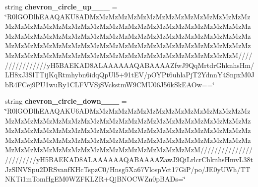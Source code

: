 \begin{DoxyCompactItemize}
\item 
\mbox{\label{class_c_utils_1_1_utils_1_1_resources_1_1_icons_af47ddce59f48636391343fb129f34833}} 
string {\bfseries chevron\+\_\+circle\+\_\+up\+\_\+\_\+\_} = \char`\"{}R0l\+G\+O\+Dlh\+E\+A\+A\+Q\+A\+K\+U8\+A\+D\+Mz\+Mz\+Mz\+Mz\+Mz\+Mz\+Mz\+Mz\+Mz\+Mz\+Mz\+Mz\+Mz\+Mz\+Mz\+Mz\+Mz\+Mz\+Mz\+Mz\+Mz\+Mz\+Mz\+Mz\+Mz\+Mz\+Mz\+Mz\+Mz\+Mz\+Mz\+Mz\+Mz\+Mz\+Mz\+Mz\+Mz\+Mz\+Mz\+Mz\+Mz\+Mz\+Mz\+Mz\+Mz\+Mz\+Mz\+Mz\+Mz\+Mz\+Mz\+Mz\+Mz\+Mz\+Mz\+Mz\+Mz\+Mz\+Mz\+Mz\+Mz\+Mz\+Mz\+Mz\+Mz\+Mz\+Mz\+Mz\+Mz\+Mz\+Mz\+Mz\+Mz\+Mz\+Mz\+Mz\+Mz\+Mz\+Mz\+Mz\+Mz\+Mz\+Mz\+Mz\+Mz\+Mz\+Mz\+Mz\+Mz\+Mz\+Mz\+Mz\+Mz\+Mz\+Mz\+Mz\+Mz\+Mz\+Mz\+Mz\+Mz\+Mz\+Mz\+Mz\+Mz\+Mz\+Mz\+Mz\+Mz\+Mz\+Mz\+Mz\+Mz\+Mz\+Mz\+Mz\+Mz\+Mz\+MzM////////////////y\+H5\+B\+A\+E\+K\+A\+D8\+A\+L\+A\+A\+A\+A\+A\+A\+Q\+A\+B\+A\+A\+A\+A\+Zfw\+J9\+Qq\+Mrtdr\+Ghknhs\+Hm/L\+H8x\+J3\+Sl\+T\+Tij\+Kq\+Rtmhybn6idq\+Qp\+Ul5+91t\+E\+V/p\+O\+Y\+Pt6uhla\+Pj\+T2\+Ydnn\+Y4\+Snpx\+M0\+Jb\+R4\+F\+Cej9\+P\+U1wu\+Ry1\+C\+L\+F\+V\+V\+Sj\+S\+Vckstm\+W9\+C\+M\+U06\+J56k\+Sk\+E\+A\+Ow==\char`\"{}
\item 
\mbox{\label{class_c_utils_1_1_utils_1_1_resources_1_1_icons_ac18ab620cef96bc7d80109807dc0083a}} 
string {\bfseries chevron\+\_\+circle\+\_\+down\+\_\+\_\+\_} = \char`\"{}R0l\+G\+O\+Dlh\+E\+A\+A\+Q\+A\+K\+U6\+A\+D\+Mz\+Mz\+Mz\+Mz\+Mz\+Mz\+Mz\+Mz\+Mz\+Mz\+Mz\+Mz\+Mz\+Mz\+Mz\+Mz\+Mz\+Mz\+Mz\+Mz\+Mz\+Mz\+Mz\+Mz\+Mz\+Mz\+Mz\+Mz\+Mz\+Mz\+Mz\+Mz\+Mz\+Mz\+Mz\+Mz\+Mz\+Mz\+Mz\+Mz\+Mz\+Mz\+Mz\+Mz\+Mz\+Mz\+Mz\+Mz\+Mz\+Mz\+Mz\+Mz\+Mz\+Mz\+Mz\+Mz\+Mz\+Mz\+Mz\+Mz\+Mz\+Mz\+Mz\+Mz\+Mz\+Mz\+Mz\+Mz\+Mz\+Mz\+Mz\+Mz\+Mz\+Mz\+Mz\+Mz\+Mz\+Mz\+Mz\+Mz\+Mz\+Mz\+Mz\+Mz\+Mz\+Mz\+Mz\+Mz\+Mz\+Mz\+Mz\+Mz\+Mz\+Mz\+Mz\+Mz\+Mz\+Mz\+Mz\+Mz\+Mz\+Mz\+Mz\+Mz\+Mz\+Mz\+Mz\+Mz\+Mz\+Mz\+Mz\+Mz\+Mz\+Mz\+MzM////////////////////////y\+H5\+B\+A\+E\+K\+A\+D8\+A\+L\+A\+A\+A\+A\+A\+A\+Q\+A\+B\+A\+A\+A\+A\+Zaw\+J9\+Qi\+Lrlcr\+Chknhs\+Hmv\+L38t\+Jz\+Sl\+N\+V\+Spu2\+D\+R\+Svanf\+K\+Hc\+Tspz\+C0/Hnsg5\+Xa67\+Vlosp\+Vct17\+GiP/po/J\+E0y\+U\+Wh/T\+T\+N\+K\+Ti1m\+Tom\+Hg\+E\+M0\+W\+Z\+F\+K\+L\+ZR+Qj\+B\+N\+O\+C\+W\+Zn0p\+B\+A\+Ds=\char`\"{}
\item 
\mbox{\label{class_c_utils_1_1_utils_1_1_resources_1_1_icons_a31e01a88bed641ac821b24ec3a4b16a0}} 

\end{DoxyCompactItemize}
